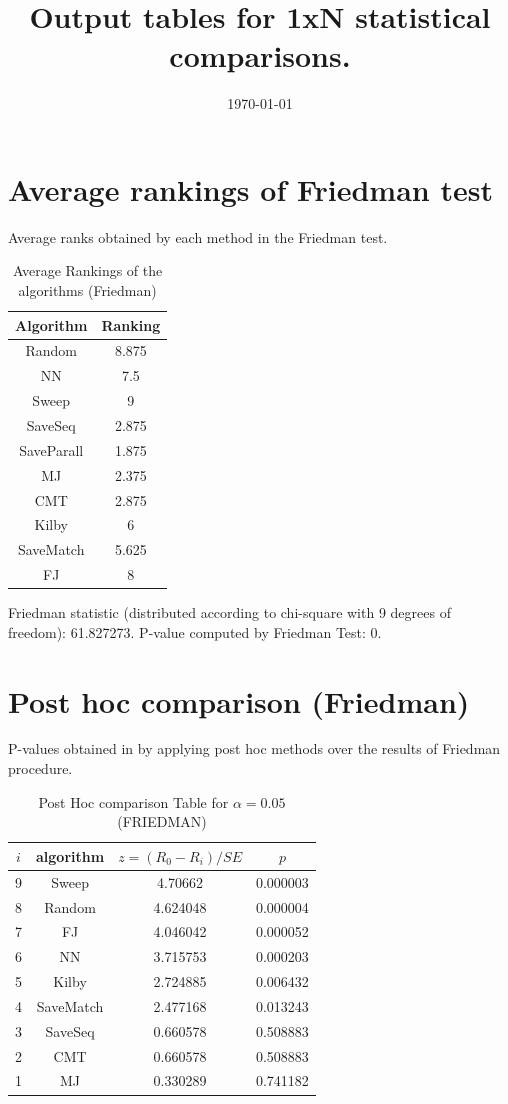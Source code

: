 \documentclass[a4paper,10pt]{article}
\title{Output tables for 1xN statistical comparisons.}
\author{}
\date{\today}
\begin{document}
\begin{landscape}
\pagestyle{empty}
\maketitle
\thispagestyle{empty}

\section{Average rankings of Friedman test}


Average ranks obtained by each method in the Friedman test.

\begin{table}[!htp]
\centering
\begin{tabular}{|c|c|}\hline
Algorithm&Ranking\\\hline
Random&8.875\\NN&7.5\\Sweep&9\\SaveSeq&2.875\\SaveParall&1.875\\MJ&2.375\\CMT&2.875\\Kilby&6\\SaveMatch&5.625\\FJ&8\\\hline\end{tabular}
\caption{Average Rankings of the algorithms (Friedman)}
\end{table}

Friedman statistic (distributed according to chi-square with 9 degrees of freedom): 61.827273. \newline P-value computed by Friedman Test: 0.\newline


\newpage

\section{Post hoc comparison (Friedman)}


P-values obtained in by applying post hoc methods over the results of Friedman procedure.

\begin{table}[!htp]
\centering\footnotesize
\begin{tabular}{cccc}
$i$&algorithm&$z=(R_0 - R_i)/SE$&$p$\\
\hline9&Sweep&4.70662&0.000003\\8&Random&4.624048&0.000004\\7&FJ&4.046042&0.000052\\6&NN&3.715753&0.000203\\5&Kilby&2.724885&0.006432\\4&SaveMatch&2.477168&0.013243\\3&SaveSeq&0.660578&0.508883\\2&CMT&0.660578&0.508883\\1&MJ&0.330289&0.741182\\\hline
\end{tabular}
\caption{Post Hoc comparison Table for $\alpha=0.05$ (FRIEDMAN)}
\end{table}
\newpage


\end{landscape}
\end{document}
